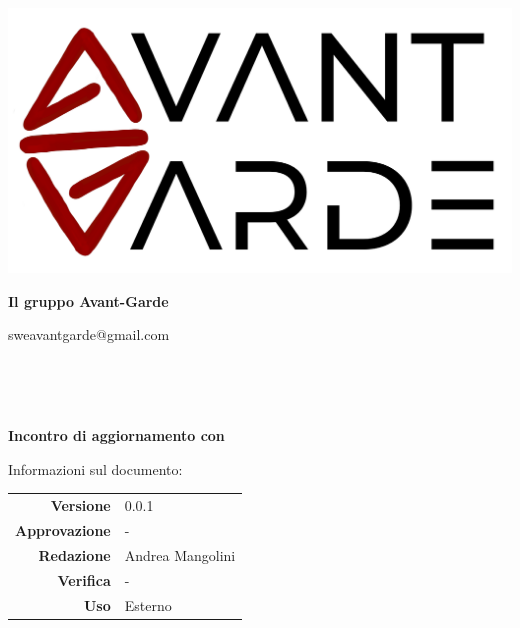     \begin{titlepage}
        \begin{center}
            \includegraphics[width=\textwidth]{logo+scritta.png}

            \vspace{0.5cm}
            {\huge \textbf{Il gruppo Avant-Garde}}

            \vspace{0.4cm}
            \large{sweavantgarde@gmail.com}

            \vspace{1.5cm}
            \hrulefill\\
            \vspace{0.2cm}
            
            \textbf{\titoloDocumento}\\
            \vspace{0.5cm}

            \textbf{Incontro di aggiornamento con \textcolor{red}{\nomeAzienda}}\\
            \hrulefill

            \vfill
            Informazioni sul documento:\\
            \vspace{0.3cm}
                \begin{tabular}{ r | l }
                    \textbf{Versione} & 0.0.1\\ %
                    \textbf{Approvazione} & -\\ %
                    \textbf{Redazione} & Andrea Mangolini\\ %
                    \textbf{Verifica} & -\\ %
                    \textbf{Uso} & Esterno\\ %
                \end{tabular}
        \end{center}
    \end{titlepage}
\restoregeometry